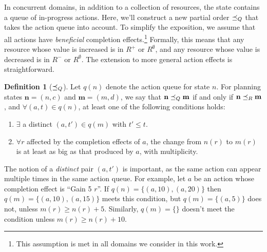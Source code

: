 \documentclass[letterpaper]{article}
\theoremstyle{plain} \newtheorem{theorem}{Theorem} \newtheorem{proposition}{Proposition} \newtheorem{lemma}{Lemma}
\theoremstyle{definition} \newtheorem{definition}{Definition} \newtheorem{conjecture}{Conjecture} \newtheorem*{example}{Example}
\theoremstyle{remark} \newtheorem*{remark}{Remark} \newtheorem*{note}{Note} \newtheorem{case}{Case}
\begin{document}
In concurrent domains, in addition to a collection of resources, the state contains a queue
of in-progress actions. Here, we'll construct a new partial order $\preceq_Q$ that takes the
action queue into account. To simplify the exposition, we assume that all
actions have \emph{beneficial} completion effects.\footnote{This assumption is met in all
domains we consider in this work.} Formally, this means that any resource whose value is
increased is in $R^+$ or $R^\emptyset$, and any resource whose value is decreased is in
$R^-$ or $R^\emptyset$. The extension to more general action effects is straightforward.
\begin{definition}[$\preceq_Q$]
	\label{def-poq}
	Let $q(n)$ denote the action queue for state $n$. For planning states $\textbf{n} = (n, c)$ and $\textbf{m} = (m, d)$, we say that $\textbf{n} \preceq_Q \textbf{m}$ if and only if $\textbf{n} \preceq_R \textbf{m}$, and $\forall (a, t) \in q(n)$, at least one of the following conditions holds:
	\begin{enumerate}
		\item $\exists$ a distinct $ (a, t') \in q(m)$ with $t' \le t$.
		\item $\forall r $ affected by the completion effects of $ a$, the change from $n(r)$ to $m(r)$ is at least as big as that produced by $a$, with multiplicity.
	\end{enumerate}
\end{definition}
The notion of a \emph{distinct} pair $(a, t')$ is important, as the same action can appear multiple times in the same action queue. For example, let $a$ be an action whose completion effect is ``Gain 5 $r$''. If $q(n) = \{(a, 10), (a, 20)\}$ then $q(m) = \{(a, 10), (a, 15)\}$ meets this condition, but $q(m) = \{(a, 5)\}$ does not, unless $m(r) \ge n(r) + 5$. Similarly, $q(m) = \{\}$ doesn't meet the condition unless $m(r) \ge n(r) + 10$.
\end{document}
